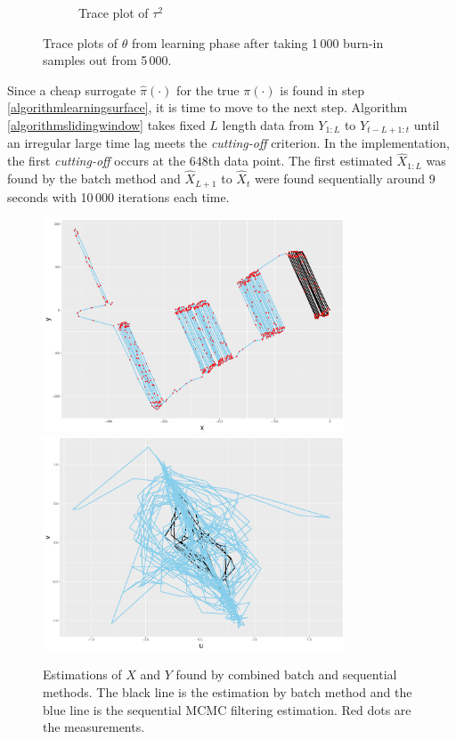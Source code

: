 \begin{figure}[h]
\begin{subfigure}[t]{0.45\textwidth}
	\caption{Trace plot of $\tau^2$}
\end{subfigure}
\caption{Trace plots of $\theta$ from learning phase after taking 1\,000 burn-in samples out from 5\,000. }
\end{figure}


Since a cheap surrogate $\hat{\pi}(\cdot)$ for the true $\pi(\cdot)$ is found in step \ref{algorithmlearningsurface}, it is time to move to the next step. Algorithm \ref{algorithmslidingwindow} takes fixed $L$ length data from $Y_{1:L}$ to $Y_{t-L+1:t}$ until an irregular large time lag meets the \textit{cutting-off} criterion. In the implementation, the first \textit{cutting-off} occurs at the $648$th data point. The first estimated $\hat{X}_{1:L}$ was found by the batch method and $\hat{X}_{L+1}$ to $\hat{X}_{t}$ were found sequentially around 9 seconds with 10\,000 iterations each time. 

\begin{figure}[h]
\centering
\includegraphics[width=0.8\textwidth]{Chapters/05MCMCOU/plots/realdatabatchPosition2.pdf}
\includegraphics[width=0.8\textwidth]{Chapters/05MCMCOU/plots/realdatabatchVelocity2.pdf}
\caption{Estimations of $X$ and $Y$ found by combined batch and sequential methods. The black line is the estimation by batch method and the blue line is the sequential MCMC filtering estimation. Red dots are the measurements.}
\end{figure}

